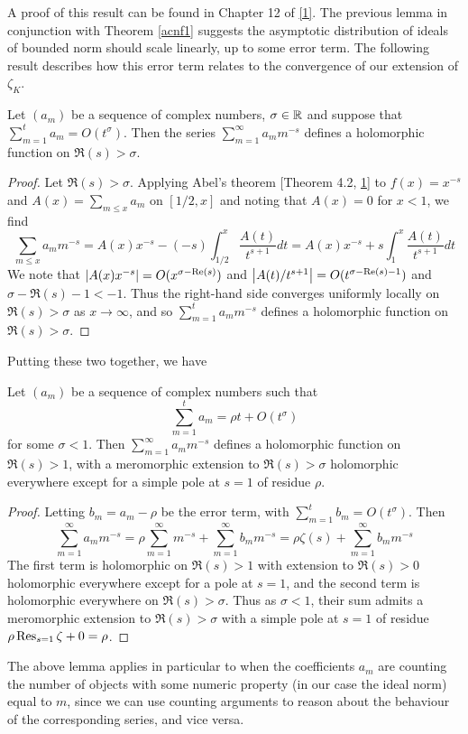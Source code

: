 \documentclass[11pt]{report}
\begin{document}
A proof of this result can be found in Chapter 12 of \hyperlink{apostol}{[1]}. The previous lemma in conjunction with Theorem \ref{acnf1} suggests the asymptotic distribution of ideals of bounded norm should scale linearly, up to some error term. The following result describes how this error term relates to the convergence of our extension of $\zeta_K$.
\begin{lemma}
    Let $(a_m)$ be a sequence of complex numbers, $\sigma \in \mathbb{R}$ and suppose that $\sum_{m = 1}^t a_m = O(t^\sigma)$. Then the series $\sum_{m = 1}^\infty a_mm^{-s}$ defines a holomorphic function on $\Re(s) > \sigma$.
\end{lemma}
\begin{proof}
    Let $\Re(s) > \sigma$. Applying Abel's theorem [Theorem 4.2, \hyperlink{apostol}{1}] to $f(x) = x^{-s}$ and $A(x) = \sum_{m \leq x}a_m$ on $[1/2, x]$ and noting that $A(x) = 0$ for $x < 1$, we find
    $$
        \sum_{m \leq x}a_mm^{-s} = A(x)x^{-s} - (-s)\int_{1/2}^x \frac{A(t)}{t^{s + 1}}dt = A(x)x^{-s} + s\int_1^x\frac{A(t)}{t^{s + 1}}dt
    $$
    We note that $\left| A(x)x^{-s} \right| = O(x^{\sigma - \text{Re}(s)})$ and $\left| A(t)/t^{s + 1} \right| = O(t^{\sigma - \text{Re}(s) - 1})$ and $\sigma - \Re(s) - 1 < -1$. Thus the right-hand side converges uniformly locally on $\Re(s) > \sigma$ as $x \to \infty$, and so $\sum_{m = 1}^t a_mm^{-s}$ defines a holomorphic function on $\Re(s) > \sigma$.
\end{proof}
Putting these two together, we have
\begin{lemma}\label{growthrate}
    Let $(a_m)$ be a sequence of complex numbers such that
    $$
        \sum_{m = 1}^t a_m = \rho t + O(t^\sigma)
    $$
    for some $\sigma < 1$. Then $\sum_{m = 1}^\infty a_mm^{-s}$ defines a holomorphic function on $\Re(s) > 1$, with a meromorphic extension to $\Re(s) > \sigma$ holomorphic everywhere except for a simple pole at $s = 1$ of residue $\rho$.
\end{lemma}
\begin{proof}
    Letting $b_m = a_m - \rho$ be the error term, with $\sum_{m = 1}^t b_m = O(t^\sigma)$. Then
    $$
        \sum_{m = 1}^\infty a_mm^{-s} = \rho\sum_{m = 1}^\infty m^{-s} + \sum_{m = 1}^\infty b_mm^{-s} = \rho\zeta(s) + \sum_{m = 1}^\infty b_mm^{-s}
    $$
    The first term is holomorphic on $\Re(s) > 1$ with extension to $\Re(s) > 0$ holomorphic everywhere except for a pole at $s = 1$, and the second term is holomorphic everywhere on $\Re(s) > \sigma$. Thus as $\sigma < 1$, their sum admits a meromorphic extension to $\Re(s) > \sigma$ with a simple pole at $s = 1$ of residue $\rho \operatorname{Res}_{s = 1}\zeta + 0 = \rho$.
\end{proof}
The above lemma applies in particular to when the coefficients $a_m$ are counting the number of objects with some numeric property (in our case the ideal norm) equal to $m$, since we can use counting arguments to reason about the behaviour of the corresponding series, and vice versa.
\end{document}
